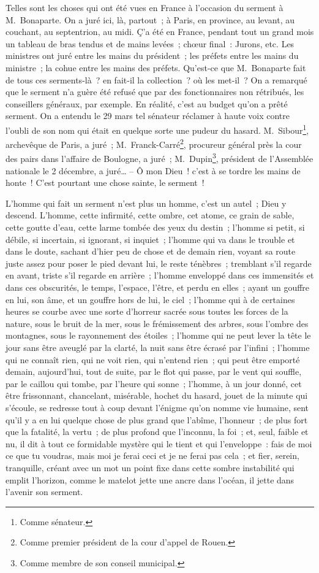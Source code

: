 \documentclass[french,twoside]{book} %
\begin{document}
\noindent Telles sont les choses qui ont été vues en France à l’occasion du serment à M. Bonaparte. On a juré ici, là, partout ; à Paris, en province, au levant, au couchant, au septentrion, au midi. Ç’a été en France, pendant tout un grand mois un tableau de bras tendus et de mains levées ; chœur final : Jurons, etc. Les ministres ont juré entre les mains du président ; les préfets entre les mains du ministre ; la cohue entre les mains des préfets. Qu’est-ce que M. Bonaparte fait de tous ces serments-là ? en fait-il la collection ? où les met-il ? On a remarqué que le serment n’a guère été refusé que par des fonctionnaires non rétribués, les conseillers généraux, par exemple. En réalité, c’est au budget qu’on a prêté serment. On a entendu le 29 mars tel sénateur réclamer à haute voix contre l’oubli de son nom qui était en quelque sorte une pudeur du hasard. M. Sibour\footnote{Comme sénateur.}, archevêque de Paris, a juré ; M. Franck-Carré\footnote{Comme premier président de la cour d’appel de Rouen.}, procureur général près la cour des pairs dans l’affaire de Boulogne, a juré ; M. Dupin\footnote{Comme membre de son conseil municipal.}, président de l’Assemblée nationale le 2 décembre, a juré… – Ô mon Dieu ! c’est à se tordre les mains de honte ! C’est pourtant une chose sainte, le serment !\par
L’homme qui fait un serment n’est plus un homme, c’est un autel ; Dieu y descend. L’homme, cette infirmité, cette ombre, cet atome, ce grain de sable, cette goutte d’eau, cette larme tombée des yeux du destin ; l’homme si petit, si débile, si incertain, si ignorant, si inquiet ; l’homme qui va dans le trouble et dans le doute, sachant d’hier peu de chose et de demain rien, voyant sa route juste assez pour poser le pied devant lui, le reste ténèbres ; tremblant s’il regarde en avant, triste s’il regarde en arrière ; l’homme enveloppé dans ces immensités et dans ces obscurités, le temps, l’espace, l’être, et perdu en elles ; ayant un gouffre en lui, son âme, et un gouffre hors de lui, le ciel ; l’homme qui à de certaines heures se courbe avec une sorte d’horreur sacrée sous toutes les forces de la nature, sous le bruit de la mer, sous le frémissement des arbres, sous l’ombre des montagnes, sous le rayonnement des étoiles ; l’homme qui ne peut lever la tête le jour sans être aveuglé par la clarté, la nuit sans être écrasé par l’infini ; l’homme qui ne connaît rien, qui ne voit rien, qui n’entend rien ; qui peut être emporté demain, aujourd’hui, tout de suite, par le flot qui passe, par le vent qui souffle, par le caillou qui tombe, par l’heure qui sonne ; l’homme, à un jour donné, cet être frissonnant, chancelant, misérable, hochet du hasard, jouet de la minute qui s’écoule, se redresse tout à coup devant l’énigme qu’on nomme vie humaine, sent qu’il y a en lui quelque chose de plus grand que l’abîme, l’honneur ; de plus fort que la fatalité, la vertu ; de plus profond que l’inconnu, la foi ; et, seul, faible et nu, il dit à tout ce formidable mystère qui le tient et qui l’enveloppe : fais de moi ce que tu voudras, mais moi je ferai ceci et je ne ferai pas cela ; et fier, serein, tranquille, créant avec un mot un point fixe dans cette sombre instabilité qui emplit l’horizon, comme le matelot jette une ancre dans l’océan, il jette dans l’avenir son serment.\par
\end{document}
